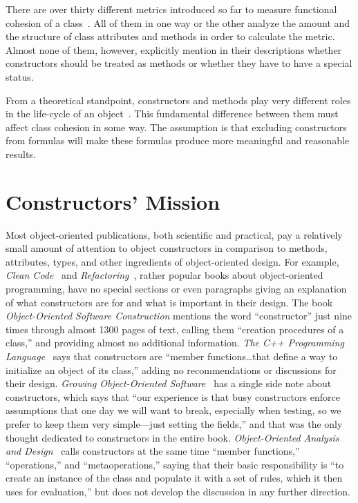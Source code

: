 \documentclass[conference]{IEEEtran}
\newcommand{\nospell}[1]{#1}
\begin{document}
There are over thirty different metrics introduced so far to
measure functional~\cite{dhama95,bieman95} cohesion of a class~\cite{izadkhah17,dallal10}.
All of them in one way or the other analyze
the amount and the structure of class attributes and methods in order to calculate the
metric. Almost none of them, however, explicitly mention in their
descriptions whether constructors should be treated as methods or
whether they have to have a special status.

From a theoretical standpoint, constructors and methods play very different
roles in the life-cycle of an object~\cite{west04}. This fundamental difference between
them must affect class cohesion in some way. The assumption is that excluding
constructors from formulas will make these formulas produce more
meaningful and reasonable results.

\section{Constructors' Mission}

Most object-oriented publications, both scientific and practical, pay
a relatively small amount of attention to object constructors
in comparison to methods, attributes, types, and other ingredients
of object-oriented design.
For example, \emph{Clean Code}~\cite{martin08} and \emph{Refactoring}~\cite{fowler99},
rather popular books about object-oriented programming,
have no special sections or even paragraphs giving an explanation
of what constructors are for and what is important in their design.
The book \emph{Object-Oriented Software Construction}\cite{meyer97}
mentions the word ``constructor'' just nine times through almost 1300 pages of text,
calling them ``creation procedures of a class,'' and providing almost
no additional information.
\emph{The C++ Programming Language}~\cite{stroustrup13} says that constructors are
``member functions\ldots that define a way to initialize an object of its class,''
adding no recommendations or discussions for their design.
\emph{Growing Object-Oriented Software}~\cite{freeman09}
has a single side note about constructors, which says that
``our experience is that busy constructors enforce assumptions that one day we will
want to break, especially when testing, so we prefer to keep them very
simple—just setting the fields,'' and that was the only thought dedicated to
constructors in the entire book.
\emph{Object-Oriented Analysis and Design}~\cite{booch07}
calls constructors at the same time ``member functions,''
``operations,'' and ``\nospell{metaoperations},'' saying that their basic responsibility
is ``to create an instance of the class and populate it
with a set of rules, which it then uses for evaluation,''
but does not develop the discussion in any further direction.
\end{document}
